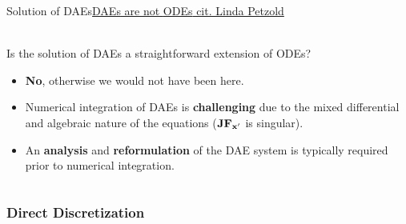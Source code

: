 \begin{frame}{Solution of \aclp{DAE}}{\underline{\acp{DAE} are not \acp{ODE} cit. Linda Petzold}}
  \vspace{-1.5cm}\hspace{4.25cm} \\[1.0em]

  Is the solution of \acp{DAE} a straightforward extension of \acp{ODE}?
  \begin{itemize}
    \item \textbf{No}, otherwise we would not have been here.
    \item Numerical integration of \acp{DAE} is \textbf{challenging} due to the mixed differential and algebraic nature of the equations ($\mathbf{JF}_{\mathbf{x}^\prime}$ is singular).
    \item An \textbf{analysis} and \textbf{reformulation} of the \ac{DAE} system is typically required prior to numerical integration.
  \end{itemize}
  \vspace{1.5em}
  \begin{columns}
    \begin{column}[t]{0.5\textwidth}
      \centering
    \end{column}
    \begin{column}[t]{0.5\textwidth}
      \centering
    \end{column}
  \end{columns}
  \vspace{1.5em}
\end{frame}

\subsubsection{Direct Discretization}

